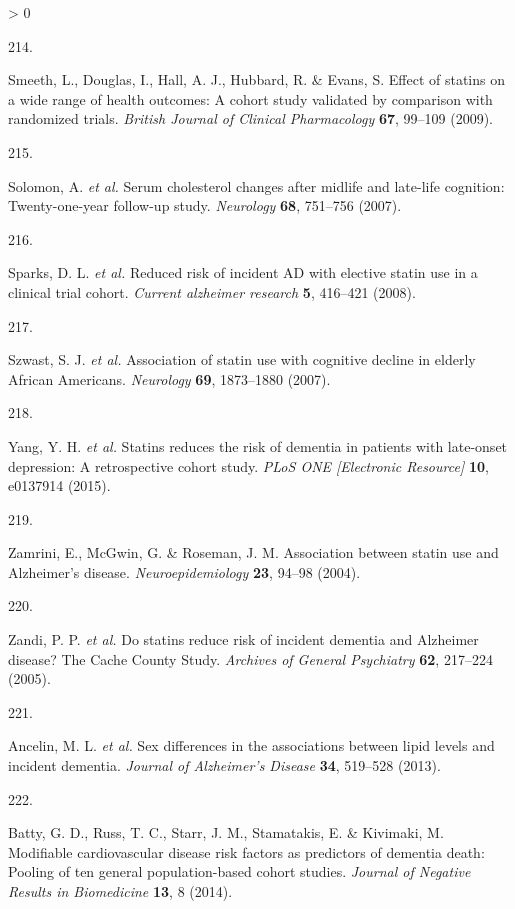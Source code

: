\documentclass[a4paper, twoside]{templates/ociamthesis}
\newlength{\cslhangindent}
\newlength{\csllabelwidth}
\newenvironment{CSLReferences}[3] %
 {%
  \setlength{\parindent}{0pt}
  \ifodd #1 \everypar{\setlength{\hangindent}{\cslhangindent}}\ignorespaces\fi
  \ifnum #2 > 0
  \setlength{\parskip}{#2\baselineskip}
  \fi
 }%
 {}
\newcommand{\CSLLeftMargin}[1]{\parbox[t]{\maxof{\widthof{#1}}{\csllabelwidth}}{#1}}
\newcommand{\CSLRightInline}[1]{\parbox[t]{\linewidth - \csllabelwidth}{#1}}
\begin{document}
\begin{CSLReferences}{0}{0}
\leavevmode\hypertarget{ref-smeeth2009}{}%
\CSLLeftMargin{214. }
\CSLRightInline{Smeeth, L., Douglas, I., Hall, A. J., Hubbard, R. \& Evans, S. Effect of statins on a wide range of health outcomes: A cohort study validated by comparison with randomized trials. \emph{British Journal of Clinical Pharmacology} \textbf{67}, 99--109 (2009).}

\leavevmode\hypertarget{ref-solomon2007}{}%
\CSLLeftMargin{215. }
\CSLRightInline{Solomon, A. \emph{et al.} Serum cholesterol changes after midlife and late-life cognition: Twenty-one-year follow-up study. \emph{Neurology} \textbf{68}, 751--756 (2007).}

\leavevmode\hypertarget{ref-sparks2008}{}%
\CSLLeftMargin{216. }
\CSLRightInline{Sparks, D. L. \emph{et al.} Reduced risk of incident {AD} with elective statin use in a clinical trial cohort. \emph{Current alzheimer research} \textbf{5}, 416--421 (2008).}

\leavevmode\hypertarget{ref-szwast2007}{}%
\CSLLeftMargin{217. }
\CSLRightInline{Szwast, S. J. \emph{et al.} Association of statin use with cognitive decline in elderly {African Americans}. \emph{Neurology} \textbf{69}, 1873--1880 (2007).}

\leavevmode\hypertarget{ref-yang2015}{}%
\CSLLeftMargin{218. }
\CSLRightInline{Yang, Y. H. \emph{et al.} Statins reduces the risk of dementia in patients with late-onset depression: A retrospective cohort study. \emph{PLoS ONE {[}Electronic Resource{]}} \textbf{10}, e0137914 (2015).}

\leavevmode\hypertarget{ref-zamrini2004}{}%
\CSLLeftMargin{219. }
\CSLRightInline{Zamrini, E., McGwin, G. \& Roseman, J. M. Association between statin use and {Alzheimer}'s disease. \emph{Neuroepidemiology} \textbf{23}, 94--98 (2004).}

\leavevmode\hypertarget{ref-zandi2005}{}%
\CSLLeftMargin{220. }
\CSLRightInline{Zandi, P. P. \emph{et al.} Do statins reduce risk of incident dementia and {Alzheimer} disease? The {Cache County Study}. \emph{Archives of General Psychiatry} \textbf{62}, 217--224 (2005).}

\leavevmode\hypertarget{ref-ancelin2013}{}%
\CSLLeftMargin{221. }
\CSLRightInline{Ancelin, M. L. \emph{et al.} Sex differences in the associations between lipid levels and incident dementia. \emph{Journal of Alzheimer's Disease} \textbf{34}, 519--528 (2013).}

\leavevmode\hypertarget{ref-batty2014}{}%
\CSLLeftMargin{222. }
\CSLRightInline{Batty, G. D., Russ, T. C., Starr, J. M., Stamatakis, E. \& Kivimaki, M. Modifiable cardiovascular disease risk factors as predictors of dementia death: Pooling of ten general population-based cohort studies. \emph{Journal of Negative Results in Biomedicine} \textbf{13}, 8 (2014).}


\end{CSLReferences}
\end{document}
